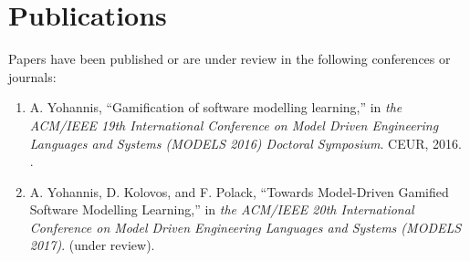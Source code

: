 \documentclass[12pt, a4paper]{report} \usepackage[titletoc]{appendix}
\begin{document}
\chapter{Publications}
\label{Publications}
Papers have been published or are under review in the following conferences or journals: 
\begin{enumerate}
 \item A. Yohannis, ``Gamification of software modelling learning,'' in
 \textit{the ACM/IEEE 19th International Conference on Model Driven Engineering Languages and Systems (MODELS 2016) Doctoral Symposium}. CEUR, 2016. \cite{Yohannis2016}.
 \item A. Yohannis, D. Kolovos, and F. Polack, ``Towards Model-Driven Gamified Software Modelling Learning,'' in \textit{the ACM/IEEE 20th International Conference on Model Driven Engineering Languages and Systems (MODELS 2017)}. (under review).
\end{enumerate}







\end{document}
